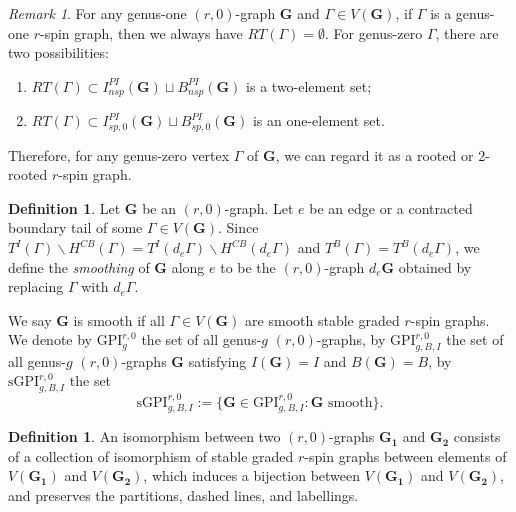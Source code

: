 \documentclass[11pt]{amsart}
\theoremstyle{definition}
\newtheorem{dfn}[dummy]{Definition}
\theoremstyle{remark}
\newtheorem{rmk}[dummy]{Remark}
\newcommand{\<}{\left<}
\renewcommand{\>}{\right>}
\numberwithin{equation}{section}
\def\GPI{{\text{GPI}}}
\def\sGPI{\text{sGPI}}
\begin{document}
\begin{rmk}\label{rmk root for vertex of PI graph}
    For any genus-one $(r,0)$-graph $\mathbf{G}$ and $\Gamma\in V(\mathbf{G})$, if $\Gamma$ is a genus-one $r$-spin graph, then we always have $RT(\Gamma)=\emptyset$. For genus-zero $\Gamma$, there are two possibilities:
    \begin{enumerate}
        \item $RT(\Gamma)\subset I^{PI}_{nsp}(\mathbf{G})\sqcup B^{PI}_{nsp}(\mathbf{G})$ is a two-element set;
        \item $RT(\Gamma)\subset I^{PI}_{sp,0}(\mathbf{G})\sqcup B^{PI}_{sp,0}(\mathbf{G})$ is an one-element set.
    \end{enumerate}
    Therefore, for any genus-zero vertex $\Gamma$ of $\mathbf{G}$, we can regard it as a rooted or 2-rooted $r$-spin graph.
\end{rmk}




\begin{dfn}
Let $\mathbf{G}$ be an $(r,0)$-graph. Let $e$ be an edge or a contracted boundary tail of some $\Gamma\in V(\mathbf{G})$. Since $T^I(\Gamma)\backslash H^{CB}(\Gamma)=T^I(d_e \Gamma)\backslash H^{CB}(d_e \Gamma)$ and $T^B(\Gamma)=T^B(d_e \Gamma)$, we define the \textit{smoothing} of $\mathbf{G}$ along $e$ to be the $(r,0)$-graph $d_e \mathbf{G}$ obtained by replacing $\Gamma$ with $d_e \Gamma$.


We say $\mathbf{G}$ is smooth if all $\Gamma\in V(\mathbf{G})$ are smooth stable graded $r$-spin graphs.
We denote by $\GPI^{r,0}_g$ the set of all genus-$g$ $(r,0)$-graphs, by $\GPI^{r,0}_{g,B,I}$ the set of all genus-$g$ $(r,0)$-graphs $\mathbf{G}$ satisfying $I(\mathbf{G})=I$ and $B(\mathbf{G})=B$, by $\sGPI^{r,0}_{g,B,I}$ the set 
$$ 
\sGPI^{r,0}_{g,B,I}:=\{\mathbf{G}\in \GPI^{r,0}_{g,B,I}\colon \mathbf{G}\text{ smooth}\}.
$$
\end{dfn}







\begin{dfn}
    An isomorphism between two $(r,0)$-graphs $\mathbf{G_1}$ and $\mathbf{G_2}$ consists of a collection of isomorphism of stable graded $r$-spin graphs between elements of $V(\mathbf{G_1})$ and $V(\mathbf{G_2})$, which induces a bijection between $V(\mathbf{G_1})$ and $V(\mathbf{G_2})$, and preserves the partitions, dashed lines, and labellings.
\end{dfn}
\end{document}
